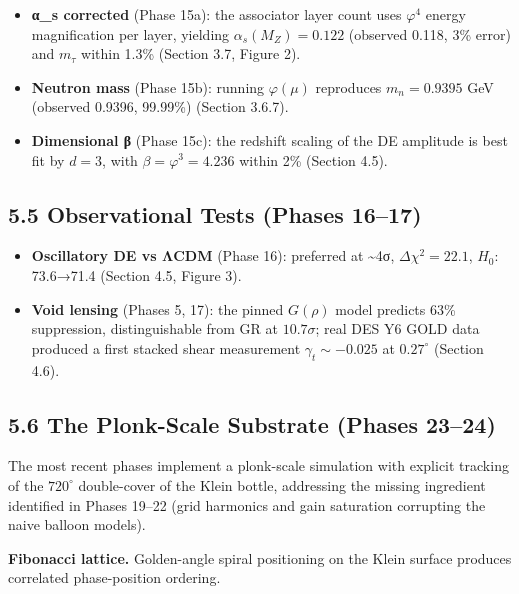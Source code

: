 \documentclass[
  11pt,
]{article}
\providecommand{\tightlist}{%
  \setlength{\itemsep}{0pt}\setlength{\parskip}{0pt}}
\begin{document}
\begin{itemize}
\tightlist
\item
  \textbf{α\_s corrected} (Phase 15a): the associator layer count uses
  \(\varphi^4\) energy magnification per layer, yielding
  \(\alpha_s(M_Z) = 0.122\) (observed 0.118, 3\% error) and \(m_\tau\)
  within 1.3\% (Section 3.7, Figure 2).
\item
  \textbf{Neutron mass} (Phase 15b): running \(\varphi(\mu)\) reproduces
  \(m_n = 0.9395\) GeV (observed 0.9396, 99.99\%) (Section 3.6.7).
\item
  \textbf{Dimensional β} (Phase 15c): the redshift scaling of the DE
  amplitude is best fit by \(d = 3\), with \(\beta = \varphi^3 = 4.236\)
  within 2\% (Section 4.5).
\end{itemize}

\subsection{5.5 Observational Tests (Phases
16--17)}\label{observational-tests-phases-1617}

\begin{itemize}
\tightlist
\item
  \textbf{Oscillatory DE vs ΛCDM} (Phase 16): preferred at
  \textasciitilde4σ, \(\Delta\chi^2 = 22.1\), \(H_0\): 73.6→71.4
  (Section 4.5, Figure 3).
\item
  \textbf{Void lensing} (Phases 5, 17): the pinned \(G(\rho)\) model
  predicts 63\% suppression, distinguishable from GR at \(10.7\sigma\);
  real DES Y6 GOLD data produced a first stacked shear measurement
  \(\gamma_t \sim -0.025\) at \(0.27^{\circ}\) (Section 4.6).
\end{itemize}

\subsection{5.6 The Plonk-Scale Substrate (Phases
23--24)}\label{the-plonk-scale-substrate-phases-2324}

The most recent phases implement a plonk-scale simulation with explicit
tracking of the \(720^{\circ}\) double-cover of the Klein bottle,
addressing the missing ingredient identified in Phases 19--22 (grid
harmonics and gain saturation corrupting the naive balloon models).

\textbf{Fibonacci lattice.} Golden-angle spiral positioning on the Klein
surface produces correlated phase-position ordering.
\end{document}
